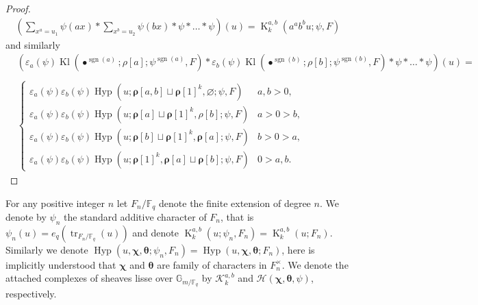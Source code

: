 \documentclass[12pt]{amsart}
\theoremstyle{plain}
\theoremstyle{definition}
\theoremstyle{remark}
\numberwithin{equation}{section}
\newcommand{\FF}{\mathbb{F}}
\DeclareMathOperator{\Kl}{Kl}%
\DeclareMathOperator{\K}{K} %
\begin{document}
\begin{proof}
\begin{align*}
\left(\sum_{x^{a}=u_1}\psi( ax) \ast \sum_{x^{b}=u_2}\psi(bx) \ast \psi \ast \dots \ast \psi\right)(u) 
=\K_k^{a,b}(a^{a}b^{b}u;\psi,F)
\end{align*}
and similarly
\begin{align*}
    &\left(\varepsilon_a(\psi)\Kl(\bullet^{\operatorname{sgn}(a) };\rho[a];\psi^{\operatorname{sgn}(a)},F)*\varepsilon_b(\psi)\Kl(\bullet^{\operatorname{sgn}(b)};\rho[b];\psi^{\operatorname{sgn}(b)},F) * \psi* \dots *\psi\right)(u) =\\ 
    \\ &\begin{cases}
        \varepsilon_a(\psi)\varepsilon_b(\psi)\operatorname{Hyp}(u;\bm{\rho} [a,b]\sqcup \bm{\rho} [1]^k,\varnothing;\psi,F)&  a,b>0, \\
        \varepsilon_a(\psi)\varepsilon_b(\psi)\operatorname{Hyp}(u;\bm{\rho}[a]\sqcup \bm{\rho}[1]^k,\rho[b];\psi,F)& a>0>b, \\
        \varepsilon_a(\psi)\varepsilon_b(\psi)\operatorname{Hyp}(u;\bm{\rho}[b]\sqcup \bm{\rho}[1]^k,\bm{\rho}[a];\psi,F)& b>0>a,\ \\\varepsilon_a(\psi)\varepsilon_b(\psi)
        \operatorname{Hyp}(u;\bm{\rho}[1]^k,\bm{\rho}[a]\sqcup \bm{\rho}[b];\psi,F)&0>a,b.
    \end{cases}
\end{align*}
\end{proof}





For any positive integer $n$ let $F_n/\FF_q$ denote the finite extension of degree $n$. We denote by $\psi_n$ the standard additive character of $F_n$, that is $\psi_n( u) = e_q(\operatorname{tr}_{F_n/\FF_q}( u))$ and denote $\K_k^{a,b}( u;\psi_n,F_n) = \K_k^{a,b}( u;F_n)$. Similarly we denote $\operatorname{Hyp}(u,\bm{\chi},\bm{\theta};\psi_n,F_n)= \operatorname{Hyp}(u,\bm{\chi},\bm{\theta};F_n)$, here is implicitly understood that $\bm{\chi}$ and $\bm{\theta}$ are family of characters in $F_n^{\times}$. We denote the attached complexes of sheaves lisse over $\mathbb{G}_{m/\FF_q}$ by $\mathcal{K}_k^{a,b}$ and $\mathcal{H}(\bm{\chi},\bm{\theta},\psi)$, respectively.
\end{document}
